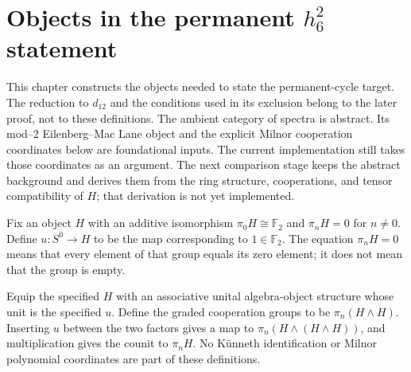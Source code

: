 \chapter{Objects in the permanent $h_6^2$ statement}
\label{chap:h6-statement}

This chapter constructs the objects needed to state the permanent-cycle
target.  The reduction to $d_{12}$ and the conditions used in its exclusion
belong to the later proof, not to these definitions.  The ambient category
of spectra is abstract.  Its mod--$2$ Eilenberg--Mac Lane object and the
explicit Milnor cooperation coordinates below are foundational inputs.
The current implementation still takes those coordinates as an argument.
The next comparison stage keeps the abstract background and derives them
from the ring structure, cooperations, and tensor compatibility of $H$;
that derivation is not yet implemented.

\begin{definition}
  \label{def:h6-em-object}
  \notready
  Fix an object $H$ with an additive isomorphism
  $\pi_0H\cong\mathbb F_2$ and $\pi_nH=0$ for $n\ne0$.
  Define $u:S^0\to H$ to be the map corresponding to $1\in\mathbb F_2$.
  The equation $\pi_nH=0$ means that every element of that group equals its
  zero element; it does not mean that the group is empty.
\end{definition}

\begin{definition}
  \label{def:h6-ring-cooperations}
  \leanok
  Equip the specified $H$ with an associative unital algebra-object
  structure whose unit is the specified $u$. Define the graded cooperation
  groups to be $\pi_n(H\wedge H)$. Inserting $u$ between the two factors
  gives a map to $\pi_n(H\wedge(H\wedge H))$, and multiplication gives
  the counit to $\pi_nH$. No K\"unneth identification or Milnor polynomial
  coordinates are part of these definitions.
\end{definition}

